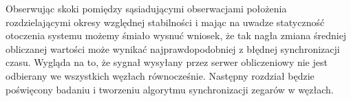 Obserwując skoki pomiędzy sąsiadującymi obserwacjami położenia rozdzielającymi okresy względnej stabilności i mając na uwadze statyczność otoczenia systemu możemy śmiało wysnuć wniosek, że tak nagła zmiana średniej obliczanej wartości może wynikać najprawdopodobniej z błędnej synchronizacji czasu. Wygląda na to, że sygnał wysyłany przez serwer obliczeniowy nie jest odbierany we wszystkich węzłach równocześnie. Następny rozdział będzie poświęcony badaniu i tworzeniu algorytmu synchronizacji zegarów w węzłach.